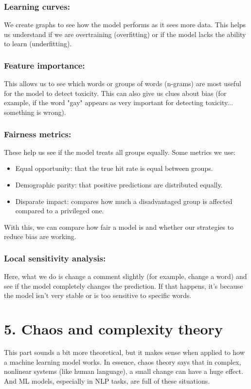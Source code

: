 \documentclass[a4paper,12pt]{article}
\begin{document}
\subsubsection*{Learning curves:}
We create graphs to see how the model performs as it sees more data. This helps us understand if we are overtraining (overfitting) or if the model lacks the ability to learn (underfitting).

\subsubsection*{Feature importance:}
This allows us to see which words or groups of words (n-grams) are most useful for the model to detect toxicity. This can also give us clues about bias (for example, if the word "gay" appears as very important for detecting toxicity... something is wrong).

\subsubsection*{Fairness metrics:}
These help us see if the model treats all groups equally. Some metrics we use:
\begin{itemize}
    \item Equal opportunity: that the true hit rate is equal between groups.
    \item Demographic parity: that positive predictions are distributed equally.
    \item Disparate impact: compares how much a disadvantaged group is affected compared to a privileged one.
\end{itemize}
With this, we can compare how fair a model is and whether our strategies to reduce bias are working.

\subsubsection*{Local sensitivity analysis:}
Here, what we do is change a comment slightly (for example, change a word) and see if the model completely changes the prediction. If that happens, it's because the model isn't very stable or is too sensitive to specific words.

\section*{5. Chaos and complexity theory}

This part sounds a bit more theoretical, but it makes sense when applied to how a machine learning model works.
In essence, chaos theory says that in complex, nonlinear systems (like human language), a small change can have a huge effect. And ML models, especially in NLP tasks, are full of these situations.
\end{document}
